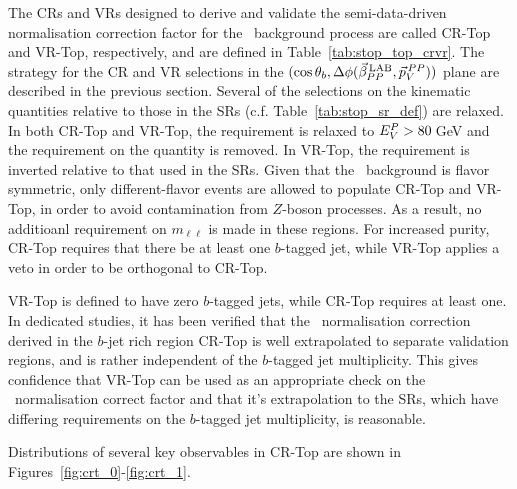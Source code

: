 The CRs and VRs designed to derive and validate the semi-data-driven
normalisation correction factor for the \ttbar~background process are called
CR-Top and VR-Top, respectively, and are defined in Table~\ref{tab:stop_top_crvr}.
The strategy for the CR and VR selections in the $(\cos\theta_b, \Delta \phi (\vec{\beta}_{PP}^{\,\text{LAB}}, \vec{p}_V^{\,PP}))$ plane are described
in the previous section.
Several of the selections on the kinematic quantities relative to those in the SRs (c.f. Table~\ref{tab:stop_sr_def})
are relaxed.
In both CR-Top and VR-Top, the \mdr requirement is relaxed to $E_V^P > 80$\,GeV and the requirement on the
\gaminv quantity is removed.
In VR-Top, the \rpt requirement is inverted relative to that used in the SRs.
Given that the \ttbar~background is flavor symmetric, only different-flavor events
are allowed to populate CR-Top and VR-Top, in order to avoid contamination from $Z$-boson processes.
As a result, no additioanl requirement on $m_{\ell\ell}$ is made in these regions.
For increased purity, CR-Top requires that there be at least one $b$-tagged jet,
while VR-Top applies a veto in order to be orthogonal to CR-Top.

VR-Top is defined to have zero $b$-tagged jets, while CR-Top requires at least one.
In dedicated studies, it has been verified that the \ttbar~normalisation correction derived
in the $b$-jet rich region CR-Top is well extrapolated to separate validation regions, and is rather
independent of the $b$-tagged jet multiplicity.
This gives confidence that VR-Top can be used as an appropriate check on the \ttbar~normalisation
correct factor and that it's extrapolation to the SRs, which have differing requirements on the
$b$-tagged jet multiplicity, is reasonable.

Distributions of several key observables in CR-Top are shown in Figures~\ref{fig:crt_0}-\ref{fig:crt_1}.
{\color{red}{VR-TOP DISTRIBUTIONS IN APPENDIX??}}

